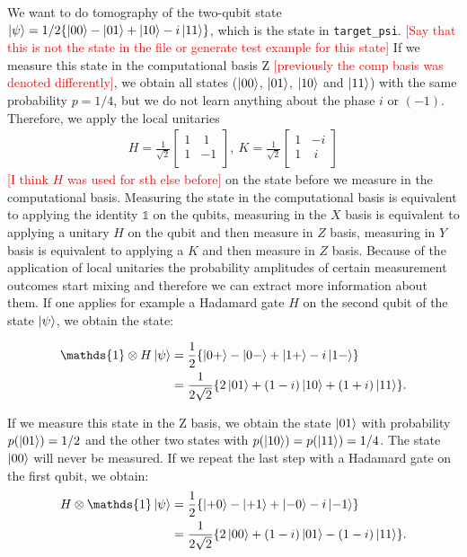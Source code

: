 \documentclass[submission, Phys]{SciPost}
\begin{document}
We want to do tomography of the two-qubit state 
$\ket{\psi} = 1/2 \{ \ket{00} - \ket{01} + \ket{10} - i \ket{11} \}$, 
which is the state in \verb|target_psi|. \textcolor{red}{[Say that this is not the state in the file or generate test example for this state]}
If we measure this state in the computational basis Z \textcolor{red}{[previously the comp basis was denoted differently]}, we obtain all states ($\ket{00}$, $\ket{01}$, $\ket{10}$ and $\ket{11}$) with the same probability $p = 1/4$, but we do not learn anything about the phase $i$ or $(-1)$. 
Therefore, we apply the local unitaries
\begin{align}
H = \frac{1}{\sqrt{2}} 
\begin{bmatrix}
1 &~1 \\
1 &-1 \\ 
\end{bmatrix},~
K = \frac{1}{\sqrt{2}} 
\begin{bmatrix}
1 &-i \\
1 &~i \\ 
\end{bmatrix}
\end{align} 
%
\textcolor{red}{[I think $H$ was used for sth else before]}
on the state before we measure in the computational basis. Measuring the state in the computational basis is equivalent to applying the identity $\mathds{1}$ on the qubits, measuring in the $X$ basis is equivalent to applying a unitary $H$ on the qubit and then measure in $Z$ basis, measuring in $Y$ basis is equivalent to applying a $K$ and then measure in $Z$ basis. Because of the application of local unitaries the probability amplitudes of certain measurement outcomes start mixing and therefore we can extract more information about them.  If one applies for example a Hadamard gate $H$ on the second qubit of the state $\ket{\psi}$, we obtain the state:

\begin{align}
\mathds{1} \otimes H \ket{\psi} &= \frac{1}{2} \{ \ket{0+} - \ket{0-} + \ket{1+} - i \ket{1-} \} \\
&=  \frac{1}{2 \sqrt{2}} \{ 2 \ket{01} + (1-i)\ket{10} + (1+i)\ket{11} \}. 
\end{align}

If we measure this state in the Z basis, we obtain the state $\ket{01}$ with probability $p(\ket{01}) = 1/2$ 
and the other two states with $p(\ket{10}) = p(\ket{11}) = 1/4$. 
The state $\ket{00}$ will never be measured. If we repeat the last step with a Hadamard gate on the first qubit, we obtain:
\begin{align}
H  \otimes \mathds{1} \ket{\psi} &= \frac{1}{2} \{ \ket{+0} - \ket{+1} + \ket{-0} - i \ket{-1} \} \\
&=  \frac{1}{2 \sqrt{2}} \{ 2 \ket{00} + (1-i)\ket{01} - (1-i)\ket{11} \}. 
\end{align}
\end{document}
